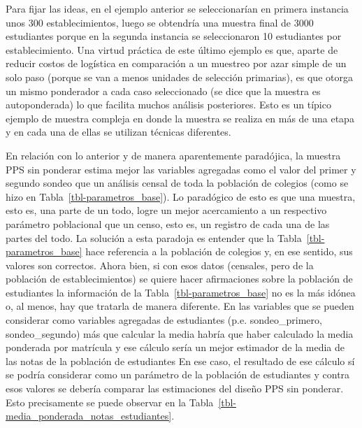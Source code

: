 \documentclass[
  spanish,
  a4paper,
]{scrreprt}
\begin{document}
Para fijar las ideas, en el ejemplo anterior se seleccionarían en
primera instancia unos 300 establecimientos, luego se obtendría una
muestra final de 3000 estudiantes porque en la segunda instancia se
seleccionaron 10 estudiantes por establecimiento. Una virtud práctica de
este último ejemplo es que, aparte de reducir costos de logística en
comparación a un muestreo por azar simple de un solo paso (porque se van
a menos unidades de selección primarias), es que otorga un mismo
ponderador a cada caso seleccionado (se dice que la muestra es
autoponderada) lo que facilita muchos análisis posteriores. Esto es un
típico ejemplo de muestra compleja en donde la muestra se realiza en más
de una etapa y en cada una de ellas se utilizan técnicas diferentes.

En relación con lo anterior y de manera aparentemente paradójica, la
muestra PPS sin ponderar estima mejor las variables agregadas como el
valor del primer y segundo sondeo que un análisis censal de toda la
población de colegios (como se hizo en Tabla~\ref{tbl-parametros_base}).
Lo paradógico de esto es que una muestra, esto es, una parte de un todo,
logre un mejor acercamiento a un respectivo parámetro poblacional que un
censo, esto es, un registro de cada una de las partes del todo. La
solución a esta paradoja es entender que la
Tabla~\ref{tbl-parametros_base} hace referencia a la población de
colegios y, en ese sentido, sus valores son correctos. Ahora bien, si
con esos datos (censales, pero de la población de establecimientos) se
quiere hacer afirmaciones sobre la población de estudiantes la
información de la Tabla~\ref{tbl-parametros_base} no es la más idónea o,
al menos, hay que tratarla de manera diferente. En las variables que se
pueden considerar como variables agregadas de estudiantes (p.e.
sondeo\_primero, sondeo\_segundo) más que calcular la media habría que
haber calculado la media ponderada por matrícula y ese cálculo sería un
mejor estimador de la media de las notas de la población de estudiantes
En ese caso, el resultado de ese cálculo sí se podría considerar como un
parámetro de la población de estudiantes y contra esos valores se
debería comparar las estimaciones del diseño PPS sin ponderar. Esto
precisamente se puede observar en la
Tabla~\ref{tbl-media_ponderada_notas_estudiantes}.
\end{document}
